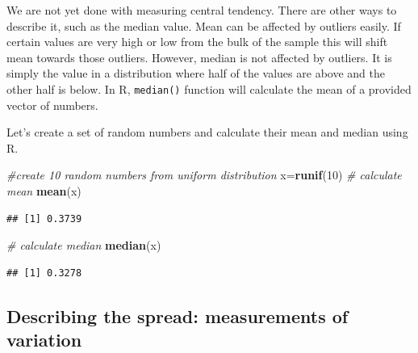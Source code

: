 \documentclass[12pt,]{krantz}
\newenvironment{Shaded}{\begin{snugshade}}{\end{snugshade}}
\newcommand{\CommentTok}[1]{\textcolor[rgb]{0.56,0.35,0.01}{\textit{#1}}}
\newcommand{\DecValTok}[1]{\textcolor[rgb]{0.00,0.00,0.81}{#1}}
\newcommand{\KeywordTok}[1]{\textcolor[rgb]{0.13,0.29,0.53}{\textbf{#1}}}
\newcommand{\NormalTok}[1]{#1}
\theoremstyle{definition}
\theoremstyle{definition}
\theoremstyle{definition}
\theoremstyle{remark}
\begin{document}
We are not yet done with measuring central tendency. There are other
ways to describe it, such as the median value. Mean can be affected by
outliers easily. If certain values are very high or low from the bulk of
the sample this will shift mean towards those outliers. However, median
is not affected by outliers. It is simply the value in a distribution
where half of the values are above and the other half is below. In R,
\texttt{median()} function will calculate the mean of a provided vector
of numbers.

Let's create a set of random numbers and calculate their mean and median
using R.

\begin{Shaded}
\begin{Highlighting}[]
\CommentTok{#create 10 random numbers from uniform distribution }
\NormalTok{x=}\KeywordTok{runif}\NormalTok{(}\DecValTok{10}\NormalTok{)}
\CommentTok{# calculate mean}
\KeywordTok{mean}\NormalTok{(x)}
\end{Highlighting}
\end{Shaded}

\begin{verbatim}
## [1] 0.3739
\end{verbatim}

\begin{Shaded}
\begin{Highlighting}[]
\CommentTok{# calculate median}
\KeywordTok{median}\NormalTok{(x)}
\end{Highlighting}
\end{Shaded}

\begin{verbatim}
## [1] 0.3278
\end{verbatim}

\hypertarget{describing-the-spread-measurements-of-variation}{%
\subsection{Describing the spread: measurements of
variation}\label{describing-the-spread-measurements-of-variation}}
\end{document}
